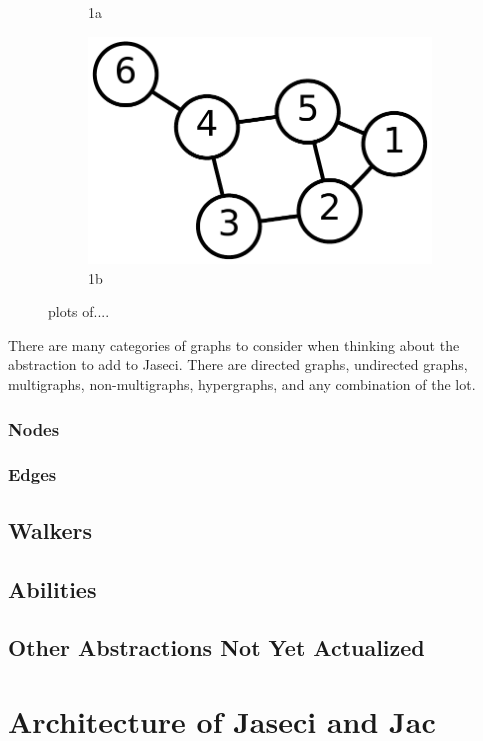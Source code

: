 \documentclass{book}
\begin{document}
\begin{figure}
\begin{subfigure}{.5\textwidth}
        \caption{1a}
        \label{fig:sfig1}
    \end{subfigure}%
    \begin{subfigure}{.5\textwidth}
        \centering
        \includegraphics[width=.8\linewidth]{assets/images/6n-graf.svg.pdf}
        \caption{1b}
        \label{fig:sfig2}
    \end{subfigure}
    \caption{plots of....}
    \label{fig:fig}
\end{figure}
There are many categories of graphs to consider when thinking about the abstraction to add to Jaseci. There are \gls{directed graphs}, \gls{undirected graphs}, \gls{multigraphs}, non-multigraphs, \gls{hypergraphs}, and any combination of the lot.
\subsection{Nodes}
\subsection{Edges}

\section{Walkers}
\section{Abilities}
\section{Other Abstractions Not Yet Actualized}

\chapter{Architecture of Jaseci and Jac}
\end{document}

